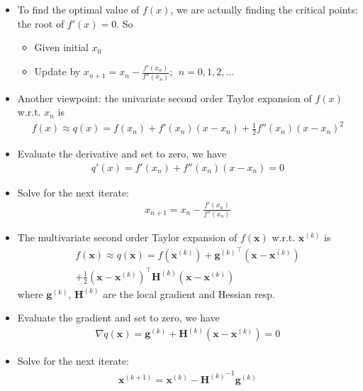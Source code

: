 \documentclass[10pt]{extarticle}
\newcommand{\ds}{\displaystyle}
\theoremstyle{definition}
\newcommand{\vx}{\mathbf{x}}
\newcommand{\vg}{\mathbf{g}}
\newcommand{\vH}{\mathbf{H}}
\begin{document}
\begin{itemize}
  \item To find the optimal value of $f(x)$, we are actually finding the critical points: the root of $f'(x) = 0$. So
    \begin{itemize}
      \item Given initial $x_0$
      \item Update by $\ds x_{n + 1} = x_n - \frac{f'(x_n)}{f''(x_n)}$; $\;n = 0, 1, 2, \ldots$
    \end{itemize}
  \item Another viewpoint: the univariate second order Taylor expansion of $f(x)$ w.r.t. $x_n$ is 
  \begin{align*}
    f(x) \approx q(x) = f(x_n) + f'(x_n)(x - x_n) + \frac{1}{2}f''(x_n)(x - x_n)^2
  \end{align*}
  \item Evaluate the derivative and set to zero, we have
    \begin{align*}
      q'(x) = f'(x_n) + f''(x_n)(x - x_n) = 0
    \end{align*}
  \item Solve for the next iterate:
    \begin{align*}
      x_{n + 1} = x_n - \frac{f'(x_n)}{f''(x_n)}
    \end{align*}
\end{itemize}

\newpage

\begin{itemize}
  \item The multivariate second order Taylor expansion of $f(\vx)$ w.r.t. $\vx^{(k)}$ is
    \begin{multline*}
      f(\vx)\approx q(\vx) = f(\vx^{(k)}) + {\vg^{(k)}}^\top(\vx - \vx^{(k)}) \\+ \frac{1}{2}(\vx - \vx^{(k)})^\top\vH^{(k)}(\vx - \vx^{(k)})
    \end{multline*}
    where $\vg^{(k)}$, $\vH^{(k)}$ are the local gradient and Hessian resp.
  \item Evaluate the gradient and set to zero, we have
    \begin{align*}
      \nabla q(\vx) = {\vg^{(k)}} + \vH^{(k)}(\vx - \vx^{(k)}) = 0
    \end{align*}
  \item Solve for the next iterate:
    \begin{align*}
      \vx^{(k + 1)} = \vx^{(k)} - {\vH^{(k)}}^{-1}\vg^{(k)}  
    \end{align*}
\end{itemize}
\end{document}
